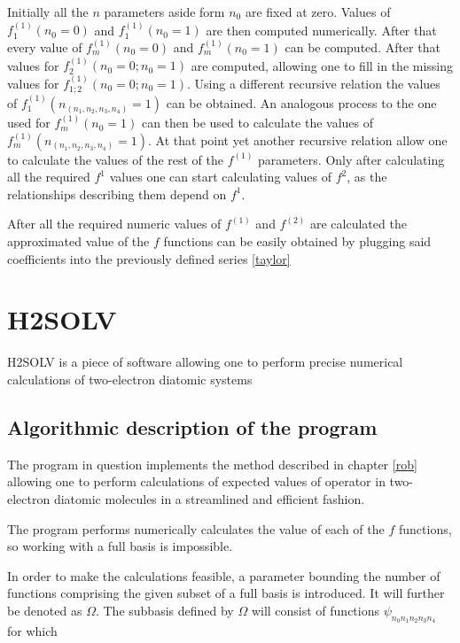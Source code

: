 \documentclass{pracalicmgr}
\begin{document}
Initially all the $n$ parameters aside form $n_0$ are fixed at zero. Values of  $f_{1}^{(1)}(n_0 = 0)$ and $f_{1}^{(1)}(n_0 = 1)$ are then computed numerically. After that every value of $f_{m}^{(1)}(n_0 = 0)$ and $f_{m}^{(1)}(n_0 = 1)$ can be computed. After that values for $f_{2}^{(1)}(n_0 = 0 ; n_0 = 1)$ are computed, allowing one to fill in the missing values for $f_{1;2}^{(1)}(n_0 = 0 ; n_0 = 1)$. Using a different recursive relation the values of $f_{1}^{(1)}\left(n_{\left(n_1,n_2,n_3,n_4\right)} = 1\right)$ can be obtained. An analogous process to the one used for $f_{m}^{(1)}(n_0 = 1)$ can then be used to calculate the values of $f_{m}^{(1)}\left(n_{\left(n_1,n_2,n_3,n_4\right)} = 1\right)$. At that point yet another recursive relation allow one to calculate the values of the rest of the $f^{(1)}$ parameters. Only after calculating all the required $f^{1}$ values one can start calculating values of $f^{2}$, as the relationships describing them depend on $f^{1}$.

After all the required numeric values of $f^{(1)}$ and $f^{(2)}$ are calculated the approximated value of the $f$ functions can be easily obtained by plugging said coefficients into the previously defined series \ref{taylor}

\chapter{H2SOLV}
\label{h2solv chapter}

H2SOLV\cite{H2SOLV} is a piece of software allowing one to perform precise numerical calculations of two-electron diatomic systems

\section{Algorithmic description of the program}

The program in question implements the method described in chapter \ref{rob} allowing one to perform calculations of expected values of operator in two-electron diatomic molecules in a streamlined and efficient fashion. 

The program performs numerically calculates the value of each of the $f$ functions, so working with a full basis is impossible. 

In order to make the calculations feasible, a parameter bounding the number of functions comprising the given subset of a full basis is introduced. It will further be denoted as $\Omega$.  The subbasis defined by $\Omega$ will consist of functions $\psi_{n_0 n_1 n_2 n_3 n_4}$ for which
\end{document}
